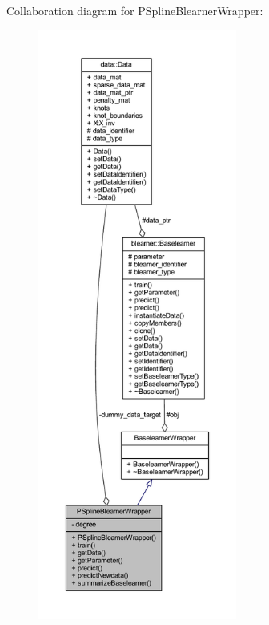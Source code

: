 Collaboration diagram for P\+Spline\+Blearner\+Wrapper\+:\nopagebreak
\begin{figure}[H]
\begin{center}
\leavevmode
\includegraphics[height=550pt]{class_p_spline_blearner_wrapper__coll__graph}
\end{center}
\end{figure}
